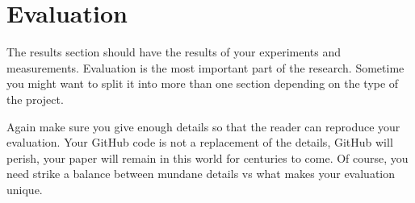 \section{Evaluation}
\label{sec:eval}


The results section should have the results of your experiments and
measurements. Evaluation is the most important part of the research. Sometime
you might want to split it into more than one section depending on the type of the project.



Again make sure you give enough details so that the reader can reproduce your
evaluation. Your GitHub code is not a replacement of the details, GitHub will
perish, your paper will remain in this world for centuries to come. Of course,
you need strike a balance between mundane details vs what makes your evaluation
unique.








